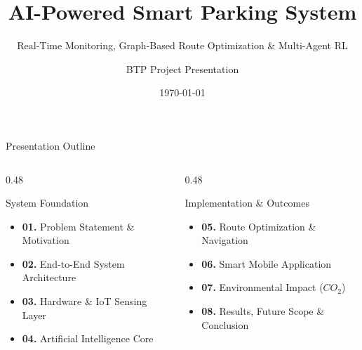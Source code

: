 \documentclass[aspectratio=169]{beamer}
\title[AI Smart Parking System]{AI-Powered Smart Parking System}
\subtitle{Real-Time Monitoring, Graph-Based Route Optimization \& Multi-Agent RL}
\author[BTP Team]{BTP Project Presentation}
\institute[Dept. of CSE]{Department of Computer Science \& Engineering}
\date{\today}
\begin{document}
\begin{frame}
    \titlepage
\end{frame}

\begin{frame}{Presentation Outline}
    \begin{columns}[t]
        \begin{column}{0.48\textwidth}
            \begin{block}{System Foundation}
                \begin{itemize}
                    \item \textbf{01.} Problem Statement \& Motivation
                    \item \textbf{02.} End-to-End System Architecture
                    \item \textbf{03.} Hardware \& IoT Sensing Layer
                    \item \textbf{04.} Artificial Intelligence Core
                \end{itemize}
            \end{block}
        \end{column}
        \begin{column}{0.48\textwidth}
            \begin{block}{Implementation \& Outcomes}
                \begin{itemize}
                    \item \textbf{05.} Route Optimization \& Navigation
                    \item \textbf{06.} Smart Mobile Application
                    \item \textbf{07.} Environmental Impact ($CO_2$)
                    \item \textbf{08.} Results, Future Scope \& Conclusion
                \end{itemize}
            \end{block}
        \end{column}
    \end{columns}
\end{frame}
\end{document}
